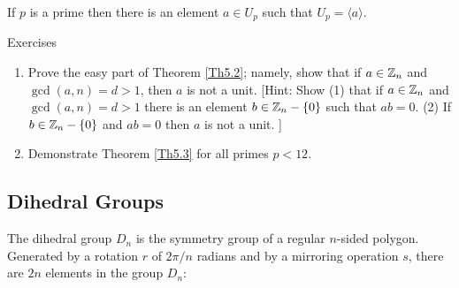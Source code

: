 \begin{comment}
Note that there are four different but similar symbols used in
mathematics:

\begin{enumerate}
\item $\phi$ : lower case Greek letter phi (pronounced \emph{fee})
\item $\Phi$ : capital Greek letter Phi
\item $\varphi$ : lower case script Greek letter phi 
\item $\emptyset$ : slashed zero (not Greek, but Danish) and symbol for
the empty set 
\end{enumerate}
\end{comment}
\begin{thm} \label{Th5.3} If $p$ is a prime then there is an element
        $a \in U_p$ such  that $U_p = \langle a \rangle $. 
\end{thm}
\begin{comment}
\noindent \textbf{Remark} It will be noted that sometimes even when
$n$ is not prime there is an $a \in U_n$ such that $U_n = \langle a
\rangle$. In fact, the following theorem from advanced number theory
tells us exactly when such an $a$ exists.
\begin{thm} If $n \ge 2$ then $U_n$ contains an element $a$
satisfying $U_n = \langle a \rangle$ if and only if $a$ has one of the
following forms: 2, 4, $p^k$, or $2p^k$ where $p$ is an odd prime and $k
\in \N$.
\end{thm}
 So, for example, there is no such $a$ in $U_n$ if $n =
 2^k$ when
 $k \ge 3$, nor for $n = 12$ or $15$. 

\end{comment}

\begin{xcb}{Exercises}
\begin{enumerate}
        \item Prove the easy part of  Theorem \ref{Th5.2}; namely,
        show that if $a \in \mathbb Z_n$ and $\gcd(a,n)=d > 1$, then
        $a$ is not a unit. [Hint: Show (1) that if 
        $a \in \mathbb Z_n$ and $\gcd(a,n)=d > 1$ there is an element $b \in
        \mathbb Z_n-\{ 0
        \}$ such that $ab=0$. (2) If $b \in \mathbb Z_n -\{ 0\}$ and $ab=0$  then
        $a$ is not a unit. ]
\item 
Demonstrate Theorem \ref{Th5.3} for all primes $p < 12$.
\end{enumerate}
        \end{xcb}
\subsection{Dihedral Groups}
The dihedral group $D_n$ is the symmetry group of a regular $n$-sided polygon.  Generated by a rotation $r$ of $2\pi/n$ radians and by a mirroring operation $s$, there are $2n$ elements in the group $D_n$:

